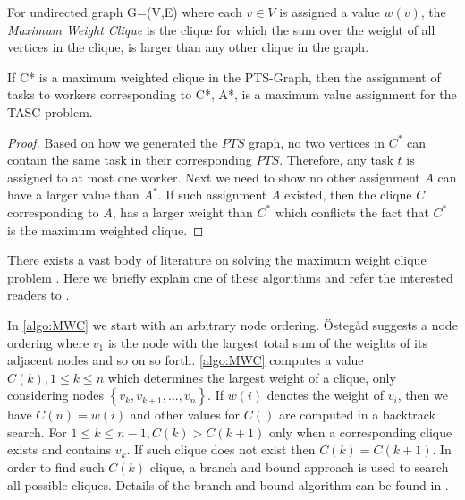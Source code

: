 \begin{definition} 
\label{def:maxClique}
For undirected graph G=(V,E) where each $v \in V$ is assigned a value $w(v)$, the \emph{Maximum Weight Clique} is the clique for which the sum over the weight of all vertices in the clique, is larger than any other clique in the graph.
\end{definition}


\begin{theorem}
\label{th:maxClique}
If C* is a maximum weighted clique in the PTS-Graph, then the assignment of tasks to workers corresponding to C*, A*, is a maximum value assignment for the TASC problem.
\end{theorem}

\begin{proof}
Based on how we generated the $PTS$ graph, no two vertices in $C^*$ can contain the same task in their corresponding $PTS$. Therefore, any task $t$ is assigned to at most one worker. Next we need to show no other assignment $A$ can have a larger value than $A^*$. If such assignment $A$ existed, then the clique $C$ corresponding to $A$, has a larger weight than $C^*$ which conflicts the fact that $C^*$ is the maximum weighted clique.
\end{proof}

There exists a vast body of literature on solving the maximum weight clique problem \cite{Kovalyov07}. Here we briefly explain one of these algorithms and refer the interested readers to \cite{Ostergard01}.

In \cref{algo:MWC} we start with an arbitrary node ordering. \"{O}steg\r{a}d \cite{Ostergard01} suggests a node ordering where $v_1$ is the node with the largest total sum of the weights of its adjacent nodes and so on so forth. \cref{algo:MWC} computes a value $C(k), 1 \leq k \leq n$ which determines the largest weight of a clique, only considering nodes $\left\{v_k, v_{k+1}, ..., v_n\right\}$. If $w(i)$ denotes the weight of $v_i$, then we have $C(n) = w(i)$ and other values for $C()$ are computed in a backtrack search. For $1 \leq k \leq n-1, C(k) > C(k+1)$ only when a corresponding clique exists and contains $v_k$. If such clique does not exist then $C(k) = C(k+1)$. In order to find such $C(k)$ clique, a branch and bound approach is used to search all possible cliques. Details of the branch and bound algorithm can be found in \cite{Ostergard01}.

